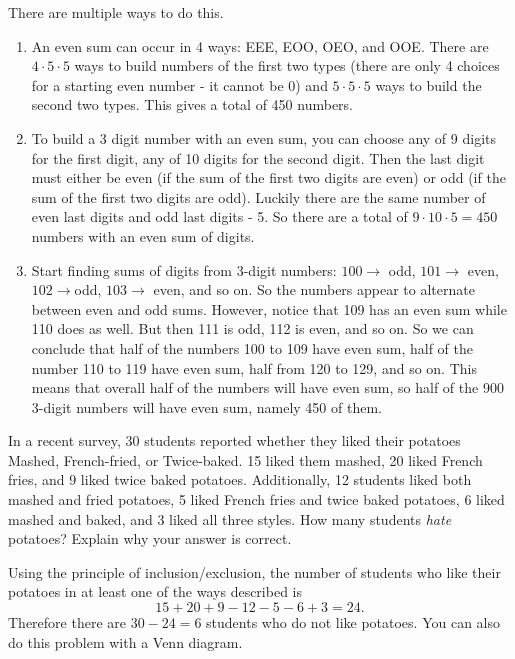 \documentclass[11pt]{exam}
\begin{document}
\begin{questions}
\begin{solution}
  There are multiple ways to do this.
  \begin{enumerate}
    \item An even sum can occur in 4 ways: EEE, EOO, OEO, and OOE.  There are $4 \cdot 5 \cdot 5$ ways to build numbers of the first two types (there are only 4 choices for a starting even number - it cannot be 0) and $5 \cdot 5 \cdot 5$ ways to build the second two types.  This gives a total of 450 numbers.
    \item To build a 3 digit number with an even sum, you can choose any of 9 digits for the first digit, any of 10 digits for the second digit.  Then the last digit must either be even (if the sum of the first two digits are even) or odd (if the sum of the first two digits are odd).  Luckily there are the same number of even last digits and odd last digits - 5.  So there are a total of $9 \cdot 10 \cdot 5 = 450$ numbers with an even sum of digits.
    \item Start finding sums of digits from 3-digit numbers: $100 \to$ odd, $101 \to$ even, $102 \to $odd, $103 \to $ even, and so on.  So the numbers appear to alternate between even and odd sums.  However, notice that 109 has an even sum while 110 does as well.  But then 111 is odd, 112 is even, and so on.  So we can conclude that half of the numbers 100 to 109 have even sum, half of the number 110 to 119 have even sum, half from 120 to 129, and so on.  This means that overall half of the numbers will have even sum, so half of the 900 3-digit numbers will have even sum, namely 450 of them.
  \end{enumerate}
\end{solution}


\question[4] In a recent survey, 30 students reported whether they liked their potatoes Mashed, French-fried, or Twice-baked. 15 liked them mashed, 20 liked French fries, and 9 liked twice baked potatoes. Additionally, 12 students liked both mashed and fried potatoes, 5 liked French fries and twice baked potatoes, 6 liked mashed and baked, and 3 liked all three styles. How many students
{\em hate} potatoes?  Explain why your answer is correct.

	\begin{solution}
	  Using the principle of inclusion/exclusion, the number of students who like their potatoes in at least one of the ways described is \[15 + 20 + 9 - 12 - 5 - 6 + 3 = 24.\]  Therefore there are $30-24 = 6$ students who do not like potatoes.  You can also do this problem with a Venn diagram.
	\end{solution}




\end{questions}
\end{document}
